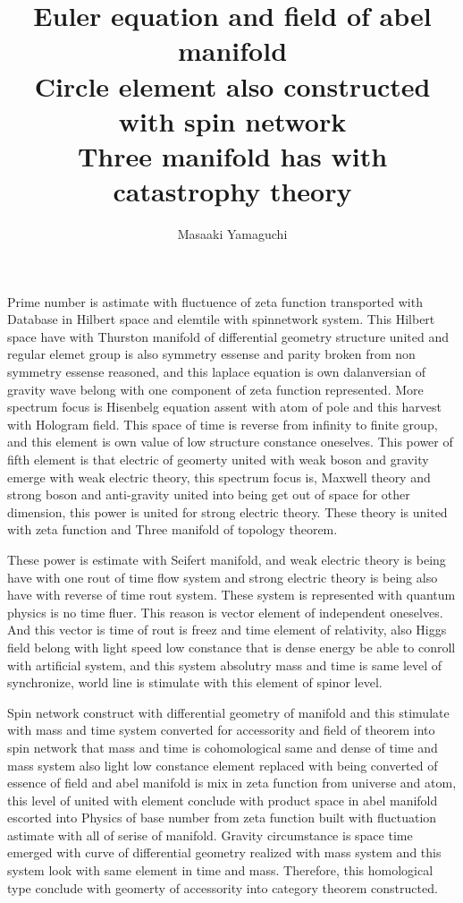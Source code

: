 \documentclass{jsarticle}
\begin{document}
\title{Euler equation and field of abel manifold \\
        Circle element also constructed with spin network \\
	Three manifold has with catastrophy theory}
\author{Masaaki Yamaguchi}
\date{}
\maketitle


    Prime number is astimate with fluctuence of zeta function transported with
  Database in Hilbert space and elemtile with spinnetwork system.
  This Hilbert space have with Thurston manifold of differential geometry
  structure united  and regular elemet group is also symmetry essense
  and parity broken from non symmetry essense reasoned, and this laplace 
  equation is own dalanversian of gravity wave belong with one component
  of zeta function represented. More spectrum focus is Hisenbelg equation
  assent with atom of pole and this harvest with Hologram field.
  This space of time is reverse from infinity to finite group,
  and this element is own value of low structure constance oneselves.
  This power of fifth element is that electric of geomerty united with
  weak boson and gravity emerge with weak electric theory,
  this spectrum focus is, Maxwell theory and strong boson and anti-gravity
  united into being get out of space for other dimension, this power 
  is united for strong electric theory.
  These theory is united with zeta function and Three manifold of topology
  theorem.


    These power is estimate with Seifert manifold, and weak electric theory
  is being have with one rout of time flow system and strong electric theory
  is being also have with reverse of time rout system.
  These system is represented with quantum physics is no time fluer.
  This reason is vector element of independent oneselves.  
  And this vector is time of rout is freez and time element of relativity,
  also Higgs field belong with light speed low constance that is dense energy
  be able to conroll with artificial system, and this system absolutry mass
  and time is same level of synchronize, world line is stimulate with this
  element of spinor level. 


    Spin network construct with differential geometry of manifold and this
  stimulate with mass and time system converted for accessority and field
  of theorem into spin network that mass and time is cohomological same
  and dense of time and mass system also light low constance element
  replaced with being converted of essence of field and abel manifold
  is mix in zeta function from universe and atom, this level of united 
  with element conclude with product space in abel manifold escorted into
  Physics of base number from zeta function built with fluctuation astimate
  with all of serise of manifold.
  Gravity circumstance is space time emerged with curve of differential geometry
  realized with mass system and this system look with same element in time and
  mass. Therefore, this homological type conclude with geomerty of accessority
  into category theorem constructed.
   
\end{document}
